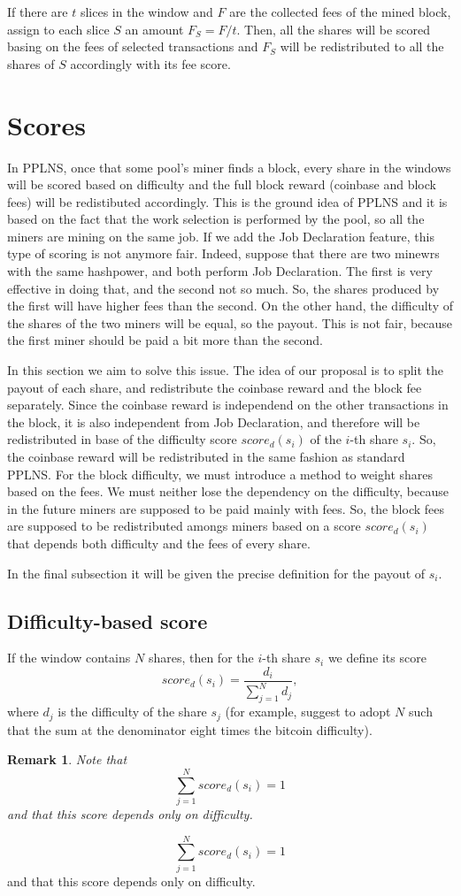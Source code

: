 \documentclass[11pt]{article}
\newtheorem{remark}{Remark}[subsection]
\begin{document}
If there are $t$ slices in the window and $F$ are the collected fees of the mined block, assign to each slice $S$ an amount $F_S = F/t$. Then, all the shares will be scored basing on the fees of selected transactions and $F_S$ will be redistributed to all the shares of $S$ accordingly with its fee score.

\section{Scores}
In PPLNS, once that some pool's miner finds a block, every share in the windows will be scored based on difficulty and the full block reward (coinbase and block fees) will be redistibuted accordingly. This is the ground idea of PPLNS and it is based on the fact that the work selection is performed by the pool, so all the miners are mining on the same job. If we add the Job Declaration feature, this type of scoring is not anymore fair. Indeed, suppose that there are two minewrs with the same hashpower, and both perform Job Declaration. The first is very effective in doing that, and the second not so much. So, the shares produced by the first will have higher fees than the second. On the other hand, the difficulty of the shares of the two miners will be equal, so the payout. This is not fair, because the first miner should be paid a bit more than the second.

In this section we aim to solve this issue. The idea of our proposal is to split the payout of each share, and redistribute the coinbase reward and the block fee separately. Since the coinbase reward is independend on the other transactions in the block, it is also independent from Job Declaration, and therefore will be redistributed in base of the difficulty score $score_d(s_i)$ of the $i$-th share $s_i$. So, the coinbase reward will be redistributed in the same fashion as standard PPLNS. \newline
For the block difficulty, we must introduce a method to weight shares based on the fees. We must neither lose the dependency on the difficulty, because in the future miners are supposed to be paid mainly with fees. So, the block fees are supposed to be redistributed amongs miners based on a score $score_d(s_i)$ that depends both difficulty and the fees of every share.

In the final subsection it will be given the precise definition for the payout of $s_i$.

\subsection{Difficulty-based score}
If the window contains $N$ shares, then for the $i$-th share $s_i$ we define its score
\[score_d(s_i) = \frac{d_i}{\sum_{j=1}^Nd_j},\]
where $d_j$ is the difficulty of the share $s_j$ (for example, \cite{ocean} suggest to adopt $N$ such that the sum at the denominator eight times the bitcoin difficulty).\newline
\begin{remark}
	Note that
	\[\sum_{j=1}^N score_d(s_i) = 1\] and that this score depends only on difficulty.
\end{remark}
\[\sum_{j=1}^N score_d(s_i) = 1\] and that this score depends only on difficulty.
\end{document}
